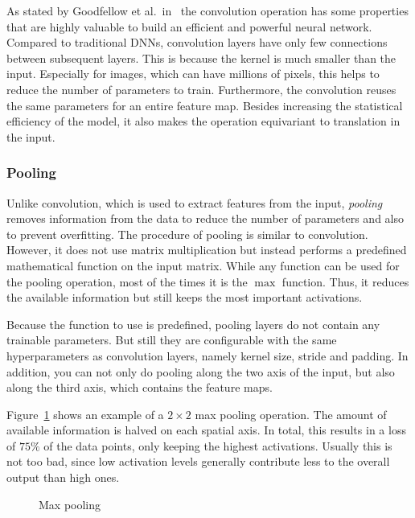 As stated by Goodfellow et al.\ in~\cite{DLbook16} the convolution operation has some properties that are highly valuable to build an efficient and powerful neural network. Compared to traditional DNNs, convolution layers have only few connections between subsequent layers. This is because the kernel is much smaller than the input. Especially for images, which can have millions of pixels, this helps to reduce the number of parameters to train. Furthermore, the convolution reuses the same parameters for an entire feature map. Besides increasing the statistical efficiency of the model, it also makes the operation equivariant to translation in the input.

\subsubsection{Pooling}
\label{sec:pooling}
Unlike convolution, which is used to extract features from the input, \emph{pooling} removes information from the data to reduce the number of parameters and also to prevent overfitting. The procedure of pooling is similar to convolution. However, it does not use matrix multiplication but instead performs a predefined mathematical function on the input matrix. While any function can be used for the pooling operation, most of the times it is the $\max$ function. Thus, it reduces the available information but still keeps the most important activations.~\cite[p.~369 f]{praxiseinstieg_ml17}

Because the function to use is predefined, pooling layers do not contain any trainable parameters. But still they are configurable with the same hyperparameters as convolution layers, namely kernel size, stride and padding. In addition, you can not only do pooling along the two axis of the input, but also along the third axis, which contains the feature maps.~\cite[p.~370]{praxiseinstieg_ml17}

Figure~\ref{fig:pooling} shows an example of a $2\times 2$ max pooling operation. The amount of available information is halved on each spatial axis. In total, this results in a loss of $75\%$ of the data points, only keeping the highest activations. Usually this is not too bad, since low activation levels generally contribute less to the overall output than high ones.

\begin{figure}[h]
    \centering
    
    \caption{Max pooling~\cite[modified]{github-latex20}}
    \label{fig:pooling}
\end{figure}

